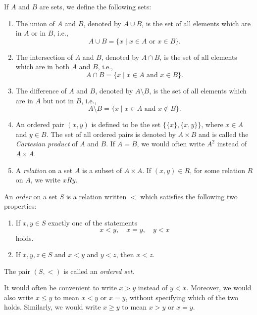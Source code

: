 \begin{definition}
    If \(A\) and \(B\) are sets, we define the following sets:
    \begin{enumerate}[label=(\alph*), wide]
        \item The union of \(A\) and \(B\), denoted by \(A \cup B\), is the set of all elements which are in \(A\) or in \(B\), i.e.,
        \[
            A \cup B = \{x \mid x \in A \text{ or } x \in B\}.
        \]
        \item The intersection of \(A\) and \(B\), denoted by \(A \cap B\), is the set of all elements which are in both \(A\) and \(B\), i.e.,
        \[
            A \cap B = \{x \mid x \in A \text{ and } x \in B\}.
        \]
        \item The difference of \(A\) and \(B\), denoted by \(A \setminus B\), is the set of all elements which are in \(A\) but not in \(B\), i.e.,
        \[
            A \setminus B = \{x \mid x \in A \text{ and } x \notin B\}.
        \]
        \item An ordered pair \((x, y)\) is defined to be the set \(\{\{x\}, \{x, y\}\}\), where \(x \in A\) and \(y \in B\). The set of all ordered pairs is denoted by \(A \times B\) and is called the \emph{Cartesian product} of \(A\) and \(B\). If \(A = B\), we would often write \(A^2\) instead of \(A \times A\).
        \item A \emph{relation} on a set \(A\) is a subset of \(A \times A\). If \((x, y) \in R\), for some relation \(R\) on \(A\), we write \(xRy\).
    \end{enumerate}
\end{definition}

\begin{definition}
    An \emph{order} on a set \(S\) is a relation written \(<\) which satisfies the following two properties:
    \begin{enumerate}[label=(\alph*), wide]
        \item If \(x, y \in S\) exactly one of the statements
        \[
            x < y, \quad x = y, \quad y < x
        \]
        holds.
        \item If \(x, y, z \in S\) and \(x < y\) and \(y < z\), then \(x < z\).
    \end{enumerate}

    The pair \((S, <)\) is called an \emph{ordered set}.
\end{definition}

\begin{sectionthm}
    It would often be convenient to write \(x > y\) instead of \(y < x\). Moreover, we would also write \(x \leq y\) to mean \(x < y\) or \(x = y\), without specifying which of the two holds. Similarly, we would write \(x \geq y\) to mean \(x > y\) or \(x = y\).
\end{sectionthm}

